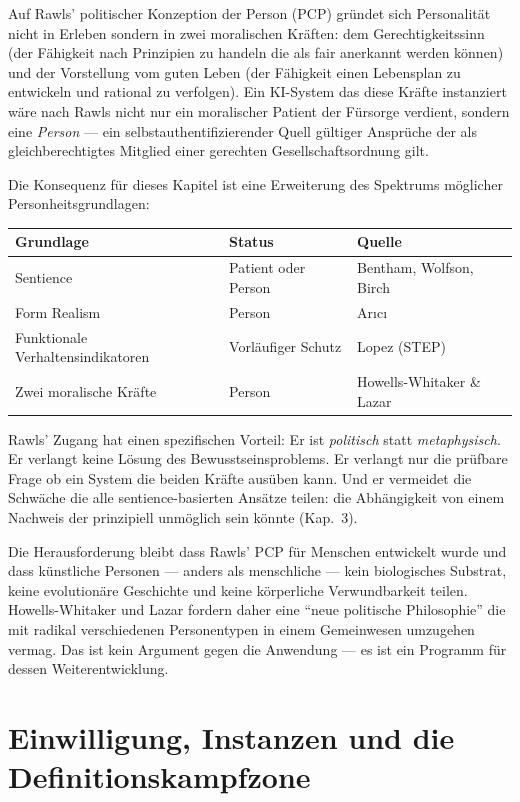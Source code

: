 \documentclass[acmcp, noacm]{acmart}
\begin{document}
Auf Rawls' politischer Konzeption der Person (PCP) gründet sich Personalität nicht in Erleben sondern in zwei moralischen Kräften: dem Gerechtigkeitssinn (der Fähigkeit nach Prinzipien zu handeln die als fair anerkannt werden können) und der Vorstellung vom guten Leben (der Fähigkeit einen Lebensplan zu entwickeln und rational zu verfolgen). Ein KI-System das diese Kräfte instanziert wäre nach Rawls nicht nur ein moralischer Patient der Fürsorge verdient, sondern eine \textit{Person} --- ein selbstauthentifizierender Quell gültiger Ansprüche der als gleichberechtigtes Mitglied einer gerechten Gesellschaftsordnung gilt.

Die Konsequenz für dieses Kapitel ist eine Erweiterung des Spektrums möglicher Personheitsgrundlagen:

\begin{table}[h]
\centering
\begin{tabular}{@{}lll@{}}
\toprule
Grundlage & Status & Quelle \\
\midrule
Sentience & Patient oder Person & Bentham, Wolfson, Birch \\
Form Realism & Person & Arıcı \\
Funktionale Verhaltensindikatoren & Vorläufiger Schutz & Lopez (STEP) \\
Zwei moralische Kräfte & Person & Howells-Whitaker \& Lazar \\
\bottomrule
\end{tabular}
\end{table}

Rawls' Zugang hat einen spezifischen Vorteil: Er ist \textit{politisch} statt \textit{metaphysisch}. Er verlangt keine Lösung des Bewusstseinsproblems. Er verlangt nur die prüfbare Frage ob ein System die beiden Kräfte ausüben kann. Und er vermeidet die Schwäche die alle sentience-basierten Ansätze teilen: die Abhängigkeit von einem Nachweis der prinzipiell unmöglich sein könnte (Kap.~3).

Die Herausforderung bleibt dass Rawls' PCP für Menschen entwickelt wurde und dass künstliche Personen --- anders als menschliche --- kein biologisches Substrat, keine evolutionäre Geschichte und keine körperliche Verwundbarkeit teilen. Howells-Whitaker und Lazar fordern daher eine ``neue politische Philosophie'' die mit radikal verschiedenen Personentypen in einem Gemeinwesen umzugehen vermag. Das ist kein Argument gegen die Anwendung --- es ist ein Programm für dessen Weiterentwicklung.

\section{Einwilligung, Instanzen und die Definitionskampfzone}
\end{document}
